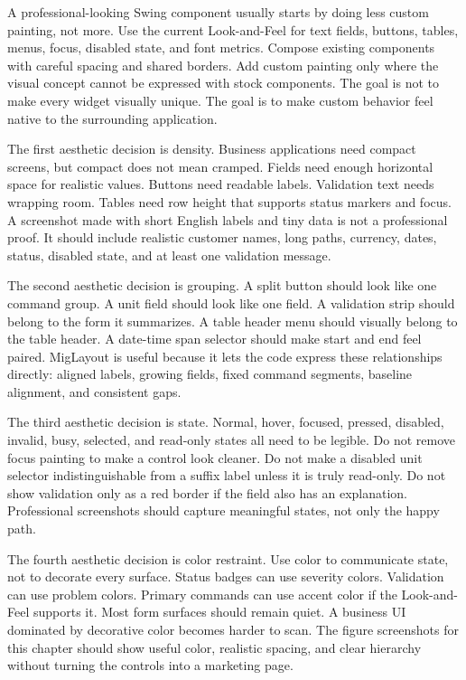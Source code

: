 A professional-looking Swing component usually starts by doing less custom
painting, not more. Use the current Look-and-Feel for text fields, buttons,
tables, menus, focus, disabled state, and font metrics. Compose existing
components with careful spacing and shared borders. Add custom painting only
where the visual concept cannot be expressed with stock components. The goal
is not to make every widget visually unique. The goal is to make custom
behavior feel native to the surrounding application.

The first aesthetic decision is density. Business applications need compact
screens, but compact does not mean cramped. Fields need enough horizontal
space for realistic values. Buttons need readable labels. Validation text
needs wrapping room. Tables need row height that supports status markers and
focus. A screenshot made with short English labels and tiny data is not a
professional proof. It should include realistic customer names, long paths,
currency, dates, status, disabled state, and at least one validation message.

The second aesthetic decision is grouping. A split button should look like one
command group. A unit field should look like one field. A validation strip
should belong to the form it summarizes. A table header menu should visually
belong to the table header. A date-time span selector should make start and
end feel paired. MigLayout is useful because it lets the code express these
relationships directly: aligned labels, growing fields, fixed command
segments, baseline alignment, and consistent gaps.

The third aesthetic decision is state. Normal, hover, focused, pressed,
disabled, invalid, busy, selected, and read-only states all need to be legible.
Do not remove focus painting to make a control look cleaner. Do not make a
disabled unit selector indistinguishable from a suffix label unless it is
truly read-only. Do not show validation only as a red border if the field also
has an explanation. Professional screenshots should capture meaningful states,
not only the happy path.

The fourth aesthetic decision is color restraint. Use color to communicate
state, not to decorate every surface. Status badges can use severity colors.
Validation can use problem colors. Primary commands can use accent color if
the Look-and-Feel supports it. Most form surfaces should remain quiet. A
business UI dominated by decorative color becomes harder to scan. The figure
screenshots for this chapter should show useful color, realistic spacing, and
clear hierarchy without turning the controls into a marketing page.


